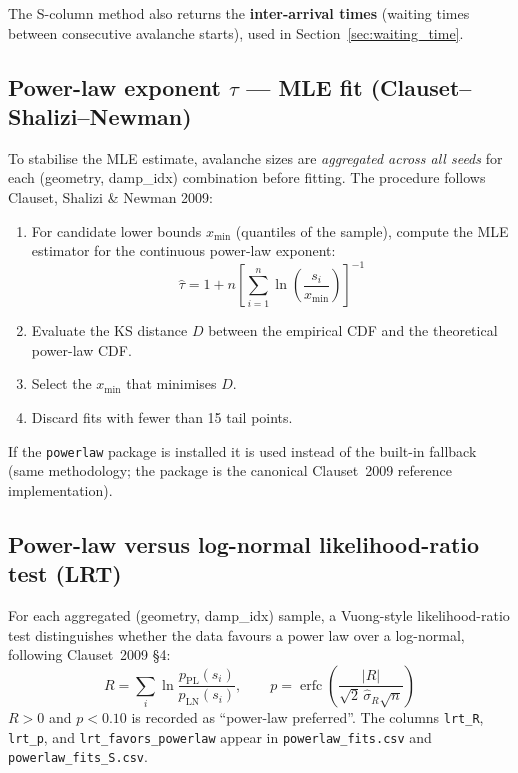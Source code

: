 \documentclass[11pt,a4paper]{article}
\newcommand{\file}[1]{\texttt{#1}}
\begin{document}
The S-column method also returns the \textbf{inter-arrival times}
(waiting times between consecutive avalanche starts), used in
Section~\ref{sec:waiting_time}.

\subsection{Power-law exponent $\tau$ --- MLE fit (Clauset--Shalizi--Newman)}

To stabilise the MLE estimate, avalanche sizes are \textit{aggregated across
all seeds} for each (geometry, damp\_idx) combination before fitting.  The
procedure follows Clauset, Shalizi \& Newman 2009:

\begin{enumerate}
  \item For candidate lower bounds $x_{\min}$ (quantiles of the sample), compute
    the MLE estimator for the continuous power-law exponent:
    \begin{equation}
      \hat{\tau} = 1 + n\left[\sum_{i=1}^n \ln\!\left(\frac{s_i}{x_{\min}}\right)\right]^{-1}
    \end{equation}
  \item Evaluate the KS distance $D$ between the empirical CDF and the
    theoretical power-law CDF.
  \item Select the $x_{\min}$ that minimises $D$.
  \item Discard fits with fewer than 15 tail points.
\end{enumerate}

If the \texttt{powerlaw} package is installed it is used instead of the
built-in fallback (same methodology; the package is the canonical
Clauset~2009 reference implementation).

\subsection{Power-law versus log-normal likelihood-ratio test (LRT)}
\label{sec:lrt}

For each aggregated (geometry, damp\_idx) sample, a Vuong-style
likelihood-ratio test distinguishes whether the data favours a power law
over a log-normal, following Clauset~2009 \S4:
\[
  R = \sum_{i} \ln\frac{p_{\mathrm{PL}}(s_i)}{p_{\mathrm{LN}}(s_i)}, \qquad
  p = \operatorname{erfc}\!\left(\frac{|R|}{\sqrt{2}\,\hat{\sigma}_{R}\sqrt{n}}\right)
\]
$R > 0$ and $p < 0.10$ is recorded as ``power-law preferred''.  The columns
\texttt{lrt\_R}, \texttt{lrt\_p}, and \texttt{lrt\_favors\_powerlaw} appear in
\file{powerlaw\_fits.csv} and \file{powerlaw\_fits\_S.csv}.
\end{document}
